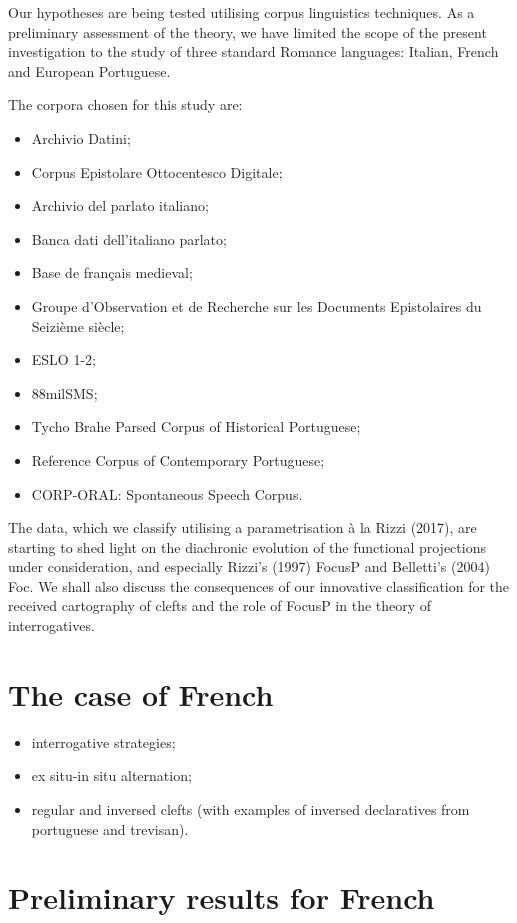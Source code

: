 \documentclass[fleqn,10pt]{wlscirep}
\begin{document}
Our hypotheses are being tested utilising corpus linguistics techniques. 
As a preliminary assessment of the theory, we have limited the scope of the present investigation to the study of three standard Romance languages: Italian, French and European Portuguese. 

The corpora chosen for this study are: 

\begin{itemize}
\item Archivio Datini;
\item Corpus Epistolare Ottocentesco Digitale;
\item Archivio del parlato italiano;
\item Banca dati dell’italiano parlato;
\item Base de français medieval;
\item Groupe d’Observation et de Recherche sur les Documents Epistolaires du Seizième siècle;
\item ESLO 1-2;
\item 88milSMS; 
\item Tycho Brahe Parsed Corpus of Historical Portuguese;
\item Reference Corpus of Contemporary Portuguese;
\item CORP-ORAL: Spontaneous Speech Corpus.
\end{itemize}

The data, which we classify utilising a parametrisation à la Rizzi (2017), are starting to shed light on the diachronic evolution of the functional projections under consideration, and especially Rizzi’s (1997) FocusP and Belletti’s (2004) Foc. We shall also discuss the consequences of our innovative classification for the received cartography of clefts and the role of FocusP in the theory of interrogatives. 

\section*{The case of French}
\begin{itemize}
    \item interrogative strategies;
    \item ex situ-in situ alternation;
    \item regular and inversed clefts (with examples of inversed declaratives from portuguese and trevisan).
    \end{itemize}

\section*{Preliminary results for French}
\end{document}

